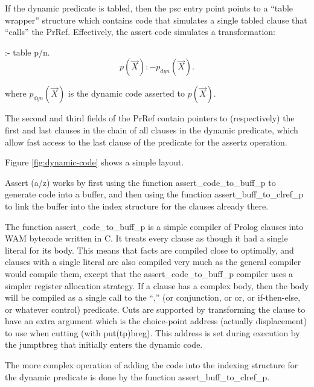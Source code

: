 \documentclass[11pt]{article}
\begin{document}
If the dynamic predicate is tabled, then the psc entry point points to
a ``table wrapper'' structure which contains code that simulates a
single tabled clause that ``calls'' the PrRef.  Effectively, the
assert code simulates a transformation:
\begin{center}
:- table p/n.
\[
p(\vec{X}):- p_{dyn}(\vec{X}). 
\]
\end{center}
where $p_{dyn}(\vec{X})$ is the dynamic code asserted to $p(\vec{X})$.

The second and third fields of the PrRef contain pointers to
(respectively) the first and last clauses in the chain of all clauses
in the dynamic predicate, which allow fast access to the last clause
of the predicate for the assertz operation.

Figure \ref{fig:dynamic-code} shows a simple layout.

Assert (a/z) works by first using the function
assert\_code\_to\_buff\_p to generate code into a buffer, and then using
the function assert\_buff\_to\_clref\_p to link the buffer into the index
structure for the clauses already there.

The function assert\_code\_to\_buff\_p is a simple compiler of Prolog
clauses into WAM bytecode written in C.  It treats every clause as
though it had a single literal for its body.  This means that facts
are compiled close to optimally, and clauses with a single literal are
also compiled very much as the general compiler would compile them,
except that the assert\_code\_to\_buff\_p compiler uses a simpler
register allocation strategy.  If a clause has a complex body, then
the body will be compiled as a single call to the ``,'' (or
conjunction, or or, or if-then-else, or whatever control) predicate.
Cuts are supported by transforming the clause to have an extra
argument which is the choice-point address (actually displacement) to
use when cutting (with put(tp)breg).  This address is set during
execution by the jumptbreg that initially enters the dynamic code.

The more complex operation of adding the code into the indexing
structure for the dynamic predicate is done by the function
assert\_buff\_to\_clref\_p.
\end{document}
